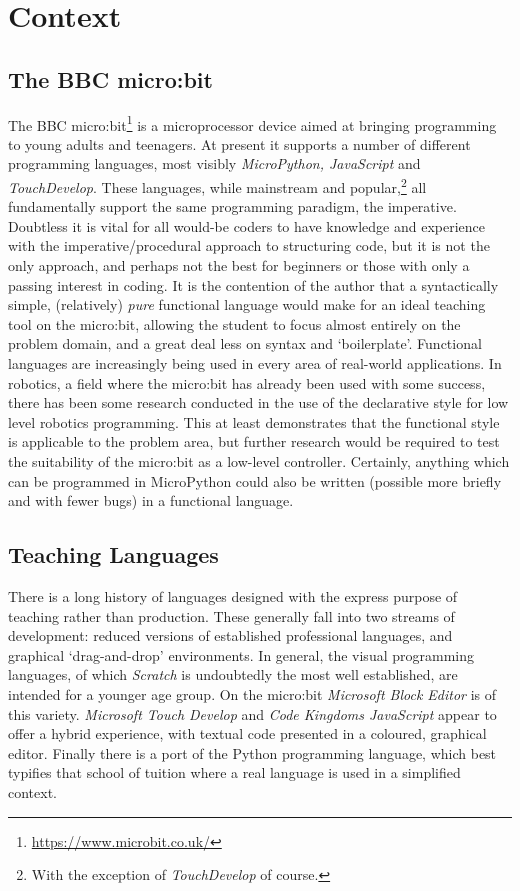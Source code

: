 \documentclass[12pt, a4paper]{report}
\begin{document}
\chapter{Context} 
\label{context}
\section{The BBC micro:bit} The BBC micro:bit\footnote{\url{https://www.microbit.co.uk/}} is a
microprocessor device aimed at bringing programming to young adults and teenagers. At present it
supports a number of different programming languages, most visibly \textit{MicroPython, JavaScript}
and \textit{TouchDevelop}. These languages, while mainstream and popular,\footnote{With the
exception of \textit{TouchDevelop} of course.} all fundamentally support the same programming
paradigm, the imperative. Doubtless it is vital for all would-be coders to have knowledge and
experience with the imperative/procedural approach to structuring code, but it is not the only
approach, and perhaps not the best for beginners or those with only a passing interest in coding.
It is the contention of the author that a syntactically simple, (relatively) \textit{pure}
functional language would make for an ideal teaching tool on the micro:bit, allowing the
student to focus almost entirely on the problem domain, and a great deal less on syntax and
`boilerplate'. Functional languages are increasingly being used in every area of real-world
applications. In robotics, a field where the micro:bit has already been used with some success,
there has been some research conducted in the use of the declarative style for low level robotics
programming\cite{frob}. This at least demonstrates that the functional style is applicable to the
problem area, but further research would be required to test the suitability of the micro:bit as
a low-level controller. Certainly, anything which can be programmed in MicroPython could also be
written (possible more briefly and with fewer bugs) in a functional language.

\section{Teaching Languages}
There is a long history of languages designed with the express purpose of teaching rather than
production. These generally fall into two streams of development: reduced versions of established
professional languages, and graphical `drag-and-drop' environments. In general, the visual
programming languages, of which \textit{Scratch} is undoubtedly the most well established, are
intended for a younger age group. On the micro:bit \textit{Microsoft Block Editor} is of this
variety. \textit{Microsoft Touch Develop} and \textit{Code Kingdoms JavaScript} appear to offer a
hybrid experience, with textual code presented in a coloured, graphical editor. Finally there is a
port of the Python programming language, which best typifies that school of tuition where a real
language is used in a simplified context.
\end{document}
